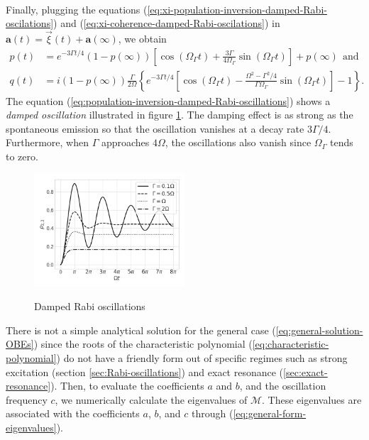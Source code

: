 {\begin{align}
	\label{eq:xi-coherence-damped-Rabi-oscilations}
\end{align}
Finally, plugging the equations (\ref{eq:xi-population-inversion-damped-Rabi-oscilations}) and (\ref{eq:xi-coherence-damped-Rabi-oscilations}) in $ \mathbf{a}(t) = \vec{\xi}(t) + \mathbf{a}(\infty) $, we obtain
\begin{align}
	p(t) &= e^{-3\Gamma t / 4}(1 - p(\infty))\left[\cos(\Omega_{\Gamma}t) + \frac{3\Gamma}{4 \Omega_{\Gamma}} \sin(\Omega_{\Gamma}t) \right] + p(\infty)\ \ \textrm{and}
	\label{eq:population-inversion-damped-Rabi-oscillations}
	\\
	q(t) &= i(1 - p(\infty)) \frac{\Gamma}{2\Omega} \left\{ e^{-3\Gamma t / 4} \left[\cos(\Omega_{\Gamma}t) - \frac{\Omega^2 - \Gamma^2 / 4}{\Gamma \Omega_{\Gamma}} \sin(\Omega_{\Gamma}t) \right] - 1 \right\}.
	\label{eq:coherence-damped-Rabi-oscillations}
\end{align}
The equation (\ref{eq:population-inversion-damped-Rabi-oscillations}) shows a \textit{damped oscillation} illustrated in figure \ref{fig:damped-Rabi-oscillations}. The damping effect is as strong as the spontaneous emission so that the oscillation vanishes at a decay rate $ 3\Gamma/4 $. Furthermore, when $ \Gamma $ approaches $ 4\Omega $, the oscillations also vanish since $ \Omega_{\Gamma} $ tends to zero.

\begin{figure}[!ht]
	\centering
	\caption{Damped Rabi oscillations}
	\vspace{-10pt}
	\includegraphics[width=0.5\textwidth]{USPSC-img/Damped_Rabi_oscillations.png}
	\label{fig:damped-Rabi-oscillations}
	\vspace{-15pt}
\end{figure}

There is not a simple analytical solution for the general case (\ref{eq:general-solution-OBEs}) since the roots of the characteristic polynomial (\ref{eq:characteristic-polynomial}) do not have a friendly form out of specific regimes such as strong excitation (section \ref{sec:Rabi-oscillations}) and exact resonance (\ref{sec:exact-resonance}). Then, to evaluate the coefficients $ a $ and $ b $, and the oscillation frequency $ c $, we numerically calculate the eigenvalues of $ \mathcal{M} $. These eigenvalues are associated with the coefficients $ a $, $ b $, and $ c $ through (\ref{eq:general-form-eigenvalues}).

}

